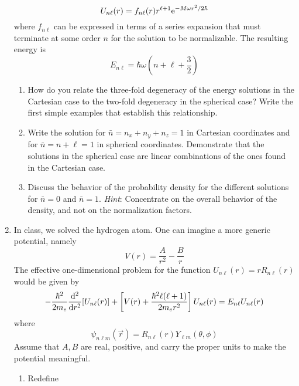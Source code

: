 \documentclass[../psets.tex]{subfiles}
\begin{document}
\begin{enumerate}
    \begin{equation}
        U_{n\ell}(r) = f_{n\ell}(r)r^{\ell+1}\e[-M\omega r^2/2\hbar]
    \end{equation}
    where $f_{n\ell}$ can be expressed in terms of a series expansion that must terminate at some order $n$ for the solution to be normalizable. The resulting energy is
    \begin{equation}
        E_{n\ell} = \hbar\omega\left( n+\ell+\frac{3}{2} \right)
    \end{equation}
    \begin{enumerate}
        \item How do you relate the three-fold degeneracy of the energy solutions in the Cartesian case to the two-fold degeneracy in the spherical case? Write the first simple examples that establish this relationship.
        \item Write the solution for $\bar{n}=n_x+n_y+n_z=1$ in Cartesian coordinates and for $\bar{n}=n+\ell=1$ in spherical coordinates. Demonstrate that the solutions in the spherical case are linear combinations of the ones found in the Cartesian case.
        \item Discuss the behavior of the probability density for the different solutions for $\bar{n}=0$ and $\bar{n}=1$. \emph{Hint}: Concentrate on the overall behavior of the density, and not on the normalization factors.
    \end{enumerate}
    \item In class, we solved the hydrogen atom. One can imagine a more generic potential, namely
    \begin{equation}
        V(r) = \frac{A}{r^2}-\frac{B}{r}
    \end{equation}
    The effective one-dimensional problem for the function $U_{n\ell}(r)=rR_{n\ell}(r)$ would be given by
    \begin{equation}
        -\frac{\hbar^2}{2m_e}\dv[2]{r}[U_{n\ell}(r)]+\left[ V(r)+\frac{\hbar^2\ell(\ell+1)}{2m_er^2} \right]U_{n\ell}(r) = E_{n\ell}U_{n\ell}(r)
    \end{equation}
    where
    \begin{equation}
        \psi_{n\ell m}(\vec{r}) = R_{n\ell}(r)Y_{\ell m}(\theta,\phi)
    \end{equation}
    Assume that $A,B$ are real, positive, and carry the proper units to make the potential meaningful.
    \begin{enumerate}
        \item Redefine
        \begin{equation}

\end{equation}
\end{enumerate}
\end{enumerate}
\end{document}
